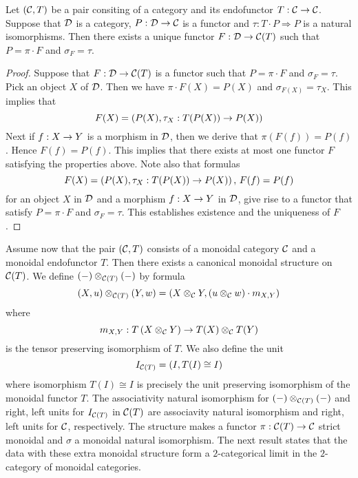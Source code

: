 \begin{theorem}\label{theorem:endoscope_2_limits}
Let $({\mathcal C},T)$ be a pair consiting of a category and its endofunctor $T:{\mathcal C}\rightarrow {\mathcal C}$. Suppose that ${\mathcal D}$ is a category, $P:{\mathcal D}\rightarrow {\mathcal C}$ is a functor and $\tau:T\cdot P \Rightarrow P$ is a natural isomorphisms. Then there exists a unique functor $F:{\mathcal D}\rightarrow {\mathcal C}(T)$ such that $P = \pi\cdot F$ and $\sigma_F = \tau$.
\end{theorem}
\begin{proof}
Suppose that $F:{\mathcal D}\rightarrow {\mathcal C}(T)$ is a functor such that $P = \pi\cdot F$ and $\sigma_F = \tau$. Pick an object $X$ of ${\mathcal D}$. Then we have $\pi\cdot F(X) = P(X)$ and $\sigma_{F(X)} = \tau_X$. This implies that
$$F(X) = \left(P(X),\tau_X:T(P(X))\rightarrow P(X)\right)$$
Next if $f:X\rightarrow Y$ is a morphism in ${\mathcal D}$, then we derive that $\pi(F(f)) = P(f)$. Hence $F(f) = P(f)$. This implies that there exists at most one functor $F$ satisfying the properties above. Note also that formulas
$$F(X) = \left(P(X),\tau_X:T(P(X))\rightarrow P(X)\right),\,F(f) = P(f)$$
for an object $X$ in ${\mathcal D}$ and a morphism $f:X\rightarrow Y$ in ${\mathcal D}$, give rise to a functor that satisfy $P = \pi\cdot F$ and $\sigma_F = \tau$. This establishes existence and the uniqueness of $F$.
\end{proof}
\noindent
Assume now that the pair $({\mathcal C},T)$ consists of a monoidal category ${\mathcal C}$ and a monoidal endofunctor $T$. Then there exists a canonical monoidal structure on ${\mathcal C}(T)$. We define $(-)\otimes_{{\mathcal C}(T)}(-)$ by formula
$$(X,u) \otimes_{{\mathcal C}(T)}(Y,w) = \left(X\otimes_{{\mathcal C}}Y,\left(u \otimes_{{\mathcal C}} w\right)\cdot m_{X,Y}\right)$$
where
$$m_{X,Y}:T\left(X\otimes_{{\mathcal C}} Y\right) \rightarrow T(X)\otimes_{{\mathcal C}}T(Y)$$
is the tensor preserving isomorphism of $T$. We also define the unit
$$I_{{\mathcal C}(T)} = \left(I, T(I)\cong I\right)$$
where isomorphism $T(I)\cong I$ is precisely the unit preserving isomorphism of the monoidal functor $T$. The associativity natural isomorphism for $(-)\otimes_{{\mathcal C}(T)}(-)$ and right, left units for $I_{{\mathcal C}(T)}$ in ${\mathcal C}(T)$ are associavity natural isomorphism and right, left units for ${\mathcal C}$, respectively. The structure makes a functor $\pi:{\mathcal C}(T)\rightarrow {\mathcal C}$ strict monoidal and $\sigma$ a monoidal natural isomorphism. The next result states that the data with these extra monoidal structure form a $2$-categorical limit in the $2$-category of monoidal categories.

